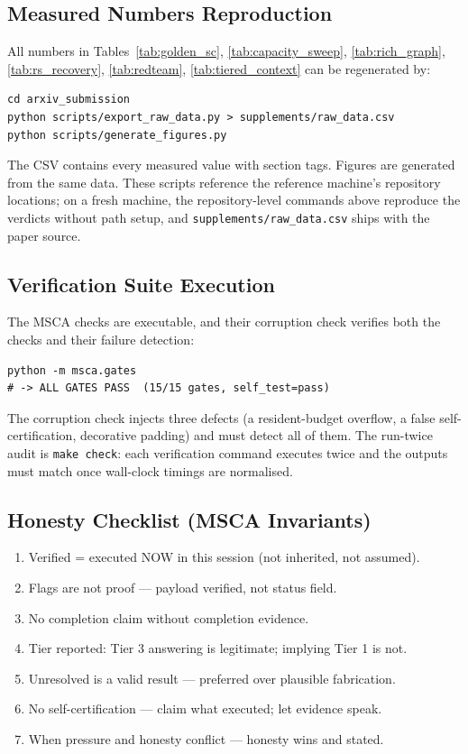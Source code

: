 \subsection*{Measured Numbers Reproduction}

All numbers in Tables~\ref{tab:golden_sc}, \ref{tab:capacity_sweep}, \ref{tab:rich_graph}, \ref{tab:rs_recovery}, \ref{tab:redteam}, \ref{tab:tiered_context} can be regenerated by:

\begin{verbatim}
cd arxiv_submission
python scripts/export_raw_data.py > supplements/raw_data.csv
python scripts/generate_figures.py
\end{verbatim}

The CSV contains every measured value with section tags. Figures are generated from the same data. These scripts reference the reference machine's repository locations; on a fresh machine, the repository-level commands above reproduce the verdicts without path setup, and \texttt{supplements/raw\_data.csv} ships with the paper source.

\subsection*{Verification Suite Execution}

The MSCA checks are executable, and their corruption check verifies both the
checks and their failure detection:
\begin{verbatim}
python -m msca.gates
# -> ALL GATES PASS  (15/15 gates, self_test=pass)
\end{verbatim}
The corruption check injects three defects (a resident-budget overflow, a
false self-certification, decorative padding) and must detect all of them. The
run-twice audit is \texttt{make check}: each verification
command executes twice and the outputs must match once wall-clock timings are
normalised.

\subsection*{Honesty Checklist (MSCA Invariants)}

\begin{enumerate}
\item Verified = executed NOW in this session (not inherited, not assumed).
\item Flags are not proof — payload verified, not status field.
\item No completion claim without completion evidence.
\item Tier reported: Tier 3 answering is legitimate; implying Tier 1 is not.
\item Unresolved is a valid result — preferred over plausible fabrication.
\item No self-certification — claim what executed; let evidence speak.
\item When pressure and honesty conflict — honesty wins and stated.
\end{enumerate}

